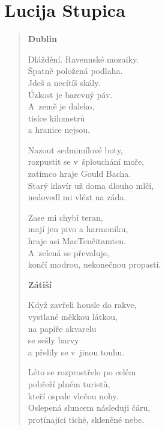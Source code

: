 \section{Lucija Stupica}

\begin{verse}

\textbf{Dublin}

\medskip

Dláždění. Ravennské mozaiky. \\
Špatně položená podlaha. \\
Jdeš a necítíš skály. \\
Úzkost je barevný páv. \\
A~země je daleko, \\
tisíce kilometrů \\
a hranice nejsou. \\

\medskip

Nazout sedmimílové boty, \\
rozpustit se v~šplouchání moře, \\
zatímco hraje Gould Bacha. \\
Starý klavír už doma dlouho mlčí, \\
nedovedl mi vlézt na záda. \\

\medskip

Zase mi chybí teran, \\
mají jen pivo a harmoniku, \\
hraje asi MacTenčitamten. \\
A~zelená se převaluje, \\
končí modrou, nekonečnou propastí. \\

\bigskip

\textbf{Zátiší}

\medskip

Když zavřeli housle do rakve, \\
vystlané měkkou látkou, \\
na papíře akvarelu \\
se sešly barvy \\
a přelily se v~jinou touhu. \\

\medskip

Léto  se rozprostřelo po celém \\
pobřeží plném turistů, \\
kteří ospale vlečou nohy. \\
Oslepená sluncem následuji čáru, \\
protínající tiché, skleněné nebe. \\


\end{verse}
